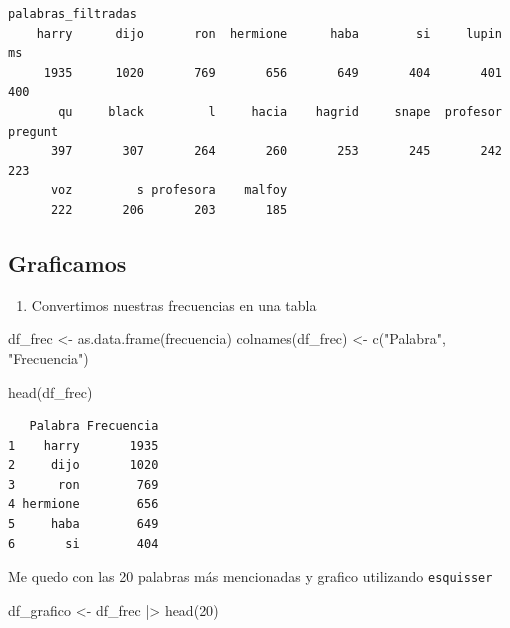 \documentclass[
  letterpaper,
  DIV=11,
  numbers=noendperiod]{scrreprt}
\newenvironment{Shaded}{\begin{snugshade}}{\end{snugshade}}
\newcommand{\DecValTok}[1]{\textcolor[rgb]{0.68,0.00,0.00}{#1}}
\newcommand{\FunctionTok}[1]{\textcolor[rgb]{0.28,0.35,0.67}{#1}}
\newcommand{\NormalTok}[1]{\textcolor[rgb]{0.00,0.23,0.31}{#1}}
\newcommand{\OtherTok}[1]{\textcolor[rgb]{0.00,0.23,0.31}{#1}}
\newcommand{\SpecialCharTok}[1]{\textcolor[rgb]{0.37,0.37,0.37}{#1}}
\newcommand{\StringTok}[1]{\textcolor[rgb]{0.13,0.47,0.30}{#1}}
\providecommand{\tightlist}{%
  \setlength{\itemsep}{0pt}\setlength{\parskip}{0pt}}\usepackage{longtable,booktabs,array}
\begin{document}
\begin{verbatim}
palabras_filtradas
    harry      dijo       ron  hermione      haba        si     lupin        ms 
     1935      1020       769       656       649       404       401       400 
       qu     black         l     hacia    hagrid     snape  profesor   pregunt 
      397       307       264       260       253       245       242       223 
      voz         s profesora    malfoy 
      222       206       203       185 
\end{verbatim}

\subsection{Graficamos}\label{graficamos}

\begin{enumerate}
\def\labelenumi{\arabic{enumi})}
\tightlist
\item
  Convertimos nuestras frecuencias en una tabla
\end{enumerate}

\begin{Shaded}
\begin{Highlighting}[]
\NormalTok{df\_frec }\OtherTok{\textless{}{-}} \FunctionTok{as.data.frame}\NormalTok{(frecuencia)}
\FunctionTok{colnames}\NormalTok{(df\_frec) }\OtherTok{\textless{}{-}} \FunctionTok{c}\NormalTok{(}\StringTok{"Palabra"}\NormalTok{, }\StringTok{"Frecuencia"}\NormalTok{)}


\FunctionTok{head}\NormalTok{(df\_frec)}
\end{Highlighting}
\end{Shaded}

\begin{verbatim}
   Palabra Frecuencia
1    harry       1935
2     dijo       1020
3      ron        769
4 hermione        656
5     haba        649
6       si        404
\end{verbatim}

Me quedo con las 20 palabras más mencionadas y grafico utilizando
\texttt{esquisser}

\begin{Shaded}
\begin{Highlighting}[]
\NormalTok{df\_grafico }\OtherTok{\textless{}{-}}\NormalTok{ df\_frec }\SpecialCharTok{|\textgreater{}} 
  \FunctionTok{head}\NormalTok{(}\DecValTok{20}\NormalTok{)}
\end{Highlighting}
\end{Shaded}
\end{document}
